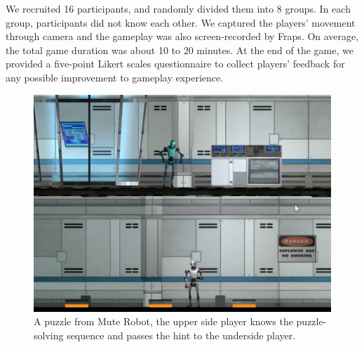 \documentclass{chi-ext}
\begin{document}

We recruited 16 participants, and randomly divided them into 8 groups. In each group, participants did not know each other. We captured the players' movement through camera and the gameplay was also screen-recorded by Fraps\cite{Fraps}.
On average, the total game duration was about 10 to 20 minutes. 
At the end of the game, we provided a five-point Likert scales questionnaire to 
collect players' feedback for any possible improvement to gameplay experience.

\begin{figure}
  \centering
  \includegraphics[width=0.8\linewidth]{figures/Figure2.jpg}
  \caption{A puzzle from Mute Robot, the upper side player knows the puzzle-solving sequence and passes the hint to the underside player.}
  \label{fig:Figure2}
\end{figure}
\end{document}
